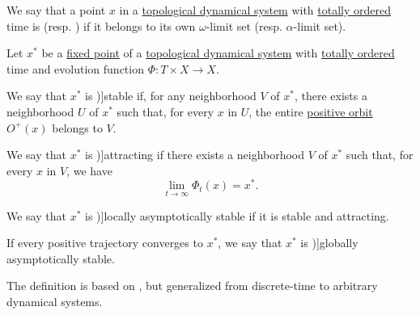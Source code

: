 \begin{definition}\label{def:dynamical_system_recurrent_point}
  We say that a point \( x \) in a \hyperref[def:topological_dynamical_system]{topological dynamical system} with \hyperref[def:totally_ordered_set]{totally ordered} time is  (resp. ) if it belongs to its own \( \omega \)-limit set (resp. \( \alpha \)-limit set).
\end{definition}

\begin{definition}\label{def:dynamical_system_stability}\mimprovised
  Let \( x^* \) be a \hyperref[def:dynamical_system_fixed_point]{fixed point} of a \hyperref[def:topological_dynamical_system]{topological dynamical system} with \hyperref[def:totally_ordered_set]{totally ordered} time and evolution function \( \Phi: T \times X \to X \).

  \begin{thmenum}
     We say that \( x^* \) is \term[en=stable (fixed point) (\cite[def. 1.2(1)]{Elaydi2007DiscreteChaos})]{stable} if, for any neighborhood \( V \) of \( x^* \), there exists a neighborhood \( U \) of \( x^* \) such that, for every \( x \) in \( U \), the entire \hyperref[def:dynamical_system_trajectory]{positive orbit} \( O^+(x) \) belongs to \( V \).

     We say that \( x^* \) is \term[en=attracting (fixed point) (\cite[def. 1.2(2)]{Elaydi2007DiscreteChaos})]{attracting} if there exists a neighborhood \( V \) of \( x^* \) such that, for every \( x \) in \( V \), we have
    \begin{equation*}
      \lim_{t \to \infty} \Phi_t(x) = x^*.
    \end{equation*}

     We say that \( x^* \) is \term[en=asymptotically stable (fixed point) (\cite[def. 1.2(3)]{Elaydi2007DiscreteChaos})]{locally asymptotically stable} if it is stable and attracting.

     If every positive trajectory converges to \( x^* \), we say that \( x^* \) is \term[en=globally asymptotically stable (fixed point) (\cite[def. 1.2(3)]{Elaydi2007DiscreteChaos})]{globally asymptotically stable}.
  \end{thmenum}
\end{definition}
\begin{comments}
  \item The definition is based on , but generalized from discrete-time to arbitrary dynamical systems.
\end{comments}

